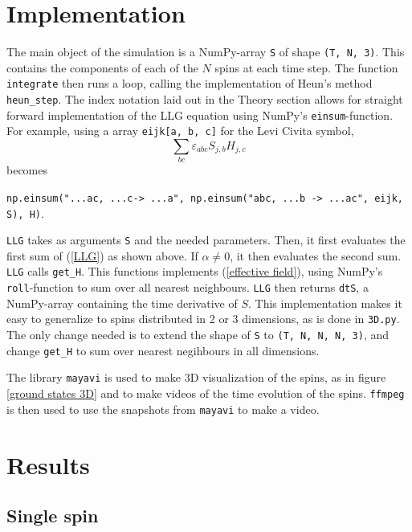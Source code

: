 \documentclass{article}
\begin{document}
    \section*{Implementation}
    The main object of the simulation is a NumPy-array \verb|S| of shape \verb|(T, N, 3)|. This contains the components of each of the $N$ spins at each time step. The function \verb|integrate| then runs a loop, calling the implementation of Heun's method \verb|heun_step|. The index notation laid out in the Theory section allows for straight forward implementation of the LLG equation using NumPy's \verb|einsum|-function. For example, using a array \verb|eijk[a, b, c]| for the Levi Civita symbol, 
    $$
    \sum_{b c}\varepsilon_{abc}S_{j, b}H_{j,c}
    $$
    becomes
    \begin{center}
        \verb|np.einsum("...ac, ...c-> ...a", np.einsum("abc, ...b -> ...ac", eijk, S), H)|.        
    \end{center}

    \verb|LLG| takes as arguments \verb|S| and the needed parameters. Then, it first evaluates the first sum of (\ref{LLG}) as shown above. If $\alpha \neq 0$, it then evaluates the second sum. \verb|LLG| calls \verb|get_H|. This functions implements (\ref{effective field}), using NumPy's \verb|roll|-function to sum over all nearest neighbours. \verb|LLG| then returns \verb|dtS|, a NumPy-array containing the time derivative of $S$. This implementation makes it easy to generalize to spins distributed in 2 or 3 dimensions, as is done in \verb|3D.py|. The only change needed is to extend the shape of \verb|S| to \verb|(T, N, N, N, 3)|, and change \verb|get_H| to sum over nearest negihbours in all dimensions.

    The library \verb|mayavi| is used to make 3D visualization of the spins, as in figure \ref{ground states 3D} and to make videos of the time evolution of the spins. \verb|ffmpeg| is then used to use the snapshots from \verb|mayavi| to make a video. 


    \section*{Results}
    \subsection*{Single spin}
\end{document}
